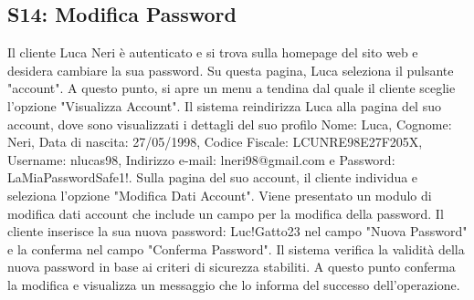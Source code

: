 \documentclass[12pt, a4paper, oneside]{book}
\begin{document}
    \subsection*{S14: Modifica Password}
        Il cliente Luca Neri è autenticato e si trova sulla homepage del sito web e desidera cambiare la sua password.
        Su questa pagina, Luca seleziona il pulsante "account".
        A questo punto, si apre un menu a tendina dal quale il cliente sceglie l'opzione "Visualizza Account".
        Il sistema reindirizza Luca alla pagina del suo account, dove sono visualizzati i dettagli del suo profilo
        Nome: Luca, Cognome: Neri, Data di nascita: 27/05/1998, Codice Fiscale: LCUNRE98E27F205X, Username: nlucas98,
        Indirizzo e-mail: lneri98@gmail.com e Password: LaMiaPasswordSafe1!.
        Sulla pagina del suo account, il cliente individua e seleziona l'opzione "Modifica Dati Account".
        Viene presentato un modulo di modifica dati account che include un campo per la modifica della password.
        Il cliente inserisce la sua nuova password: Luc!Gatto23 nel campo "Nuova Password" e la conferma nel campo "Conferma Password".
        Il sistema verifica la validità della nuova password in base ai criteri di sicurezza stabiliti.
        A questo punto conferma la modifica e visualizza un messaggio che lo informa del successo dell'operazione.
\end{document}
